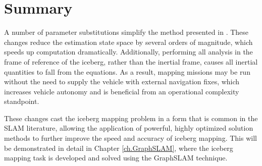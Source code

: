 \section{Summary}

A number of parameter substitutions simplify the method presented in \cite{Kimball2011}. These changes reduce the estimation state space by several orders of magnitude, which speeds up computation dramatically. Additionally, performing all analysis in the frame of reference of the iceberg, rather than the inertial frame, causes all inertial quantities to fall from the equations. As a result, mapping missions may be run without the need to supply the vehicle with external navigation fixes, which increases vehicle autonomy and is beneficial from an operational complexity standpoint. 

These changes cast the iceberg mapping problem in a form that is common in the SLAM literature, allowing the application of powerful, highly optimized solution methods to further improve the speed and accuracy of iceberg mapping. This will be demonstrated in detail in Chapter \ref{ch.GraphSLAM}, where the iceberg mapping task is developed and solved using the GraphSLAM technique. 

